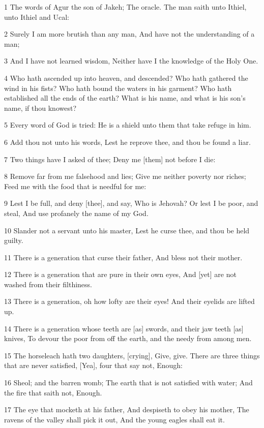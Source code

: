 \par 1 The words of Agur the son of Jakeh; The oracle. The man saith unto Ithiel, unto Ithiel and Ucal:
\par 2 Surely I am more brutish than any man, And have not the understanding of a man;
\par 3 And I have not learned wisdom, Neither have I the knowledge of the Holy One.
\par 4 Who hath ascended up into heaven, and descended? Who hath gathered the wind in his fists? Who hath bound the waters in his garment? Who hath established all the ends of the earth? What is his name, and what is his son's name, if thou knowest?
\par 5 Every word of God is tried: He is a shield unto them that take refuge in him.
\par 6 Add thou not unto his words, Lest he reprove thee, and thou be found a liar.
\par 7 Two things have I asked of thee; Deny me [them] not before I die:
\par 8 Remove far from me falsehood and lies; Give me neither poverty nor riches; Feed me with the food that is needful for me:
\par 9 Lest I be full, and deny [thee], and say, Who is Jehovah? Or lest I be poor, and steal, And use profanely the name of my God.
\par 10 Slander not a servant unto his master, Lest he curse thee, and thou be held guilty.
\par 11 There is a generation that curse their father, And bless not their mother.
\par 12 There is a generation that are pure in their own eyes, And [yet] are not washed from their filthiness.
\par 13 There is a generation, oh how lofty are their eyes! And their eyelids are lifted up.
\par 14 There is a generation whose teeth are [as] swords, and their jaw teeth [as] knives, To devour the poor from off the earth, and the needy from among men.
\par 15 The horseleach hath two daughters, [crying], Give, give. There are three things that are never satisfied, [Yea], four that say not, Enough:
\par 16 Sheol; and the barren womb; The earth that is not satisfied with water; And the fire that saith not, Enough.
\par 17 The eye that mocketh at his father, And despiseth to obey his mother, The ravens of the valley shall pick it out, And the young eagles shall eat it.
